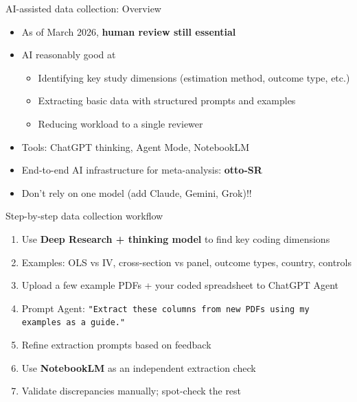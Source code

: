 \documentclass{beamer} %
\begin{document}
\begin{frame}{AI-assisted data collection: Overview}
\begin{itemize}
  \item As of March 2026, \textbf{human review still essential}
  \item AI reasonably good at \\
	
	\smallskip
	
  \begin{itemize}
    \item Identifying key study dimensions (estimation method, outcome type, etc.)
    \item Extracting basic data with structured prompts and examples
    \item Reducing workload to a single reviewer
  \end{itemize}
	
		
	\smallskip
	
  \item Tools: ChatGPT thinking, Agent Mode, NotebookLM
  \item End-to-end AI infrastructure for meta-analysis: \textbf{otto-SR}
	\item Don't rely on one model (add Claude, Gemini, Grok)!!
\end{itemize}
\end{frame}

\begin{frame}{Step-by-step data collection workflow}
\begin{enumerate}
  \item Use \textbf{Deep Research + thinking model} to find key coding dimensions
  \item Examples: OLS vs IV, cross-section vs panel, outcome types, country, controls
  \item Upload a few example PDFs + your coded spreadsheet to ChatGPT Agent
  \item Prompt Agent: \texttt{"Extract these columns from new PDFs using my examples as a guide."}
  \item Refine extraction prompts based on feedback
  \item Use \textbf{NotebookLM} as an independent extraction check
  \item Validate discrepancies manually; spot-check the rest
\end{enumerate}
\end{frame}
\end{document}
